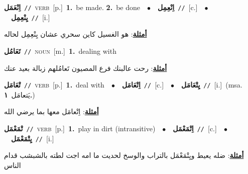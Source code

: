 \documentclass[10pt,a4paper,twoside]{article} %
\begin{document}
\begin{multicols}{2}
{\setlength\topsep{0pt}\textbf{\foreignlanguage{arabic}{اِنْعَمَل}}\ {\color{gray}\texttt{//}\color{black}}\ \textsc{verb}\ [p.]\ \textbf{1.}~be made.  \textbf{2.}~be done\ \ $\bullet$\ \ \setlength\topsep{0pt}\textbf{\foreignlanguage{arabic}{اِنْعِمِل}}\ {\color{gray}\texttt{//}\color{black}}\ [c.]\ \ $\bullet$\ \ \setlength\topsep{0pt}\textbf{\foreignlanguage{arabic}{يِنْعِمِل}}\ {\color{gray}\texttt{//}\color{black}}\ [i.]\  \begin{flushright}\color{gray}\foreignlanguage{arabic}{\textbf{\underline{\foreignlanguage{arabic}{أمثلة}}}: هو الغسيل كاين سحري عشان يِنْعِمِل لحاله}\end{flushright}\color{black}} \vspace{2mm}

{\setlength\topsep{0pt}\textbf{\foreignlanguage{arabic}{تَعَامُل}}\ {\color{gray}\texttt{//}\color{black}}\ \textsc{noun}\ [m.]\ \textbf{1.}~dealing with\  \begin{flushright}\color{gray}\foreignlanguage{arabic}{\textbf{\underline{\foreignlanguage{arabic}{أمثلة}}}: رحت عالبنك فرع المصيون تَعامُلهم زبالة بعيد عنك}\end{flushright}\color{black}} \vspace{2mm}

{\setlength\topsep{0pt}\textbf{\foreignlanguage{arabic}{تْعَامَل}}\ {\color{gray}\texttt{//}\color{black}}\ \textsc{verb}\ [p.]\ \textbf{1.}~deal with\ \ $\bullet$\ \ \setlength\topsep{0pt}\textbf{\foreignlanguage{arabic}{اِتْعَامَل}}\ {\color{gray}\texttt{//}\color{black}}\ [c.]\ \ $\bullet$\ \ \setlength\topsep{0pt}\textbf{\foreignlanguage{arabic}{يِتْعَامَل}}\ {\color{gray}\texttt{//}\color{black}}\ [i.]\ \color{gray}(msa. \foreignlanguage{arabic}{يَتعامَل}~\foreignlanguage{arabic}{\textbf{١.}})\color{black}\  \begin{flushright}\color{gray}\foreignlanguage{arabic}{\textbf{\underline{\foreignlanguage{arabic}{أمثلة}}}: اِتْعامَل معها بما يرضي الله}\end{flushright}\color{black}} \vspace{2mm}

{\setlength\topsep{0pt}\textbf{\foreignlanguage{arabic}{تْمَعْمَل}}\ {\color{gray}\texttt{//}\color{black}}\ \textsc{verb}\ [p.]\ \textbf{1.}~play in dirt (intransitive)\ \ $\bullet$\ \ \setlength\topsep{0pt}\textbf{\foreignlanguage{arabic}{اِتْمَعْمَل}}\ {\color{gray}\texttt{//}\color{black}}\ [c.]\ \ $\bullet$\ \ \setlength\topsep{0pt}\textbf{\foreignlanguage{arabic}{يِتْمَعْمَل}}\ {\color{gray}\texttt{//}\color{black}}\ [i.]\  \begin{flushright}\color{gray}\foreignlanguage{arabic}{\textbf{\underline{\foreignlanguage{arabic}{أمثلة}}}: ضله يعيط ويِتْمَعْمَل بالتراب والوسخ لحديت ما امه اجت لطته بالشبشب قدام الناس}\end{flushright}\color{black}} \vspace{2mm}


\end{multicols}
\end{document}
